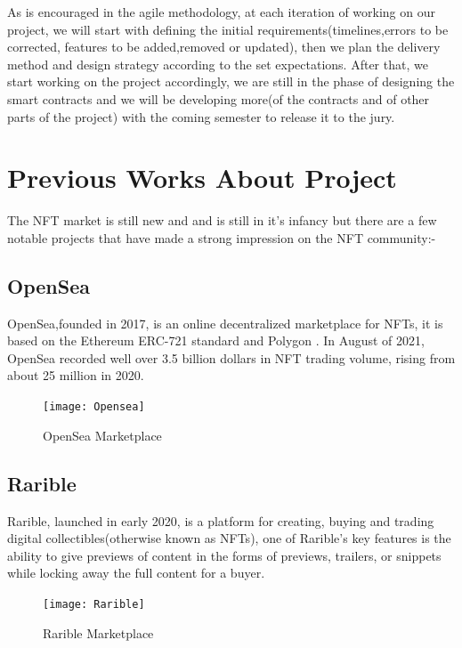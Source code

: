 \documentclass[a4paper,12pt]{article}
\begin{document}
As is encouraged in the agile methodology, at each iteration of working on our project, we will start with defining the initial requirements(timelines,errors to be corrected, features to be added,removed or updated), then we plan the delivery method and design strategy according to the set  expectations. After that, we start working on the project accordingly, we are still in the phase of designing the smart contracts and we will be developing more(of the contracts and of other parts of the project) with the coming semester to release it to the jury.


\section{Previous Works About Project}
The NFT market is still new and and is still in it's infancy but there are a few notable projects that have made a strong impression on the NFT community:-

\subsection{OpenSea}
OpenSea,founded in 2017, is an online decentralized marketplace for NFTs, it is based on the Ethereum ERC-721 standard and Polygon . In August of 2021,  OpenSea recorded well over 3.5 billion dollars in NFT trading volume, rising from about 25 million in 2020. 
\begin{figure}[h]
\centering
\texttt{[image: Opensea]}
\caption{OpenSea Marketplace}
\end{figure}

\vspace{1cm}


\subsection{Rarible}
Rarible, launched in early 2020, is a platform for creating, buying and trading digital collectibles(otherwise known as NFTs), one of Rarible’s key features is the ability to give previews of content in the forms of previews, trailers, or snippets while locking away the full content for a buyer.
\begin{figure}[h]
\centering
\texttt{[image: Rarible]}
\caption{Rarible Marketplace}
\end{figure}
\end{document}
